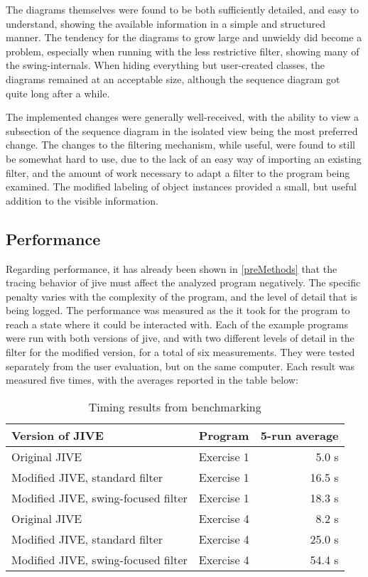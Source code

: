 The diagrams themselves were found to be both sufficiently detailed, and easy to understand, showing the available information in a simple and structured manner.
The tendency for the diagrams to grow large and unwieldy did become a problem, especially when running with the less restrictive filter, showing many of the swing-internals.
When hiding everything but user-created classes, the diagrams remained at an acceptable size, although the sequence diagram got quite long after a while.

The implemented changes were generally well-received, with the ability to view a subsection of the sequence diagram in the isolated view being the most preferred change.
The changes to the filtering mechanism, while useful, were found to still be somewhat hard to use, due to the lack of an easy way of importing an existing filter, and the amount of work necessary to adapt a filter to the program being examined.
The modified labeling of object instances provided a small, but useful addition to the visible information.

\subsection{Performance}\label{jiveEvalPerf}
Regarding performance, it has already been shown in \cref{preMethods} that the tracing behavior of \gls{jive} must affect the analyzed program negatively.
The specific penalty varies with the complexity of the program, and the level of detail that is being logged.
The performance was measured as the it took for the program to reach a state where it could be interacted with.
Each of the example programs were run with both versions of \gls{jive}, and with two different levels of detail in the filter for the modified version, for a total of six measurements.
They were tested separately from the user evaluation, but on the same computer.
Each result was measured five times, with the averages reported in the table below:

\begin{table}[H]
	\begin{center}
		\label{tab:testPerf}
		\caption{Timing results from benchmarking}
		\begin{tabular}{llr}
			\hline
			Version of JIVE & Program & 5-run average\\ \hline
			Original JIVE & Exercise 1 & 5.0 s\\
			Modified JIVE, standard filter & Exercise 1 & 16.5 s\\
			Modified JIVE, swing-focused filter & Exercise 1 & 18.3 s\\
			Original JIVE & Exercise 4 & 8.2 s\\ 
			Modified JIVE, standard filter & Exercise 4 & 25.0 s\\ 
			Modified JIVE, swing-focused filter & Exercise 4 & 54.4 s\\ \hline
		\end{tabular}
	\end{center}
\end{table}


